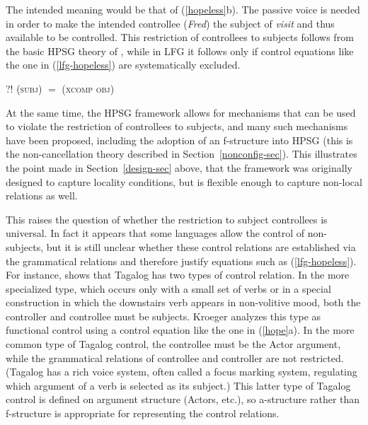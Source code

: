 \begin{exe} 
\ex 
\label{hopeless}
\begin{xlist}
\end{xlist}
\end{exe}
The intended meaning would be that of (\ref{hopeless}b).  The passive voice is needed in order to make the intended controllee (\textit{Fred})  the subject of \textit{visit} and thus available to be controlled.  This restriction of controllees to subjects follows from the basic HPSG theory of \citet[132-145]{ps2}, while in LFG it follows only if control equations like the one in (\ref{lfg-hopeless}) are systematically excluded.
\begin{exe} 
\ex 
\label{lfg-hopeless}
 {?! (\up \textsc{subj})  $=$  (\up \textsc{xcomp} \textsc{obj})}
\end{exe}
At the same time, the HPSG framework allows for mechanisms that can be used to violate the restriction of controllees to subjects, and many such mechanisms have been proposed, including the adoption of an f-structure into HPSG (this is the non-cancellation theory described in Section~\ref{nonconfig-sec}).  This illustrates the point made in Section~\ref{design-sec} above, that the framework was originally designed to capture locality conditions, but is flexible enough to capture non-local relations as well.  

This raises the question of whether the restriction to subject controllees is universal.  In fact it appears that some languages allow the control of non-subjects, but it is still unclear whether these control relations are established via the grammatical relations and therefore justify equations such as (\ref{lfg-hopeless}).  For instance,   \citet{kroeger:1993} shows that Tagalog has two types of control relation.  In the more specialized type, which occurs only with a small set of verbs or in a special construction in which the downstairs verb appears in non-volitive mood, both the controller and controllee must be subjects.  
Kroeger analyzes this type as functional control using a control equation like the one in (\ref{hope}a).  In the more common type of Tagalog control, the controllee must be the Actor argument, while the grammatical relations of controllee and controller are not restricted.  (Tagalog has a rich voice system, often called a focus marking system, regulating which argument of a verb is selected as its subject.)  
This latter type of Tagalog control is defined on argument structure (Actors, etc.), so a-structure rather than f-structure is appropriate for representing the control relations.    

